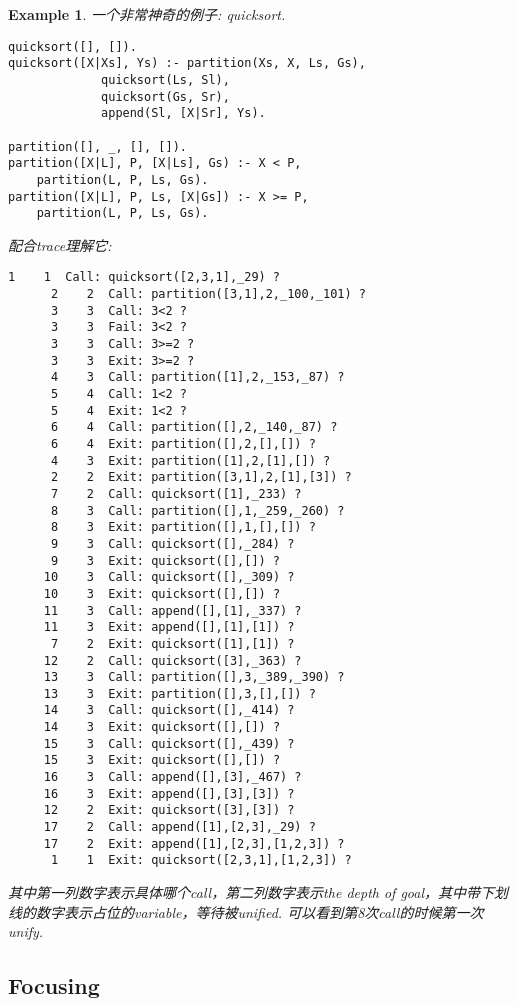 \documentclass{article}
\theoremstyle{plain}
\newtheorem{example}[theorem]{Example}
\theoremstyle{nonumberplain}
\begin{document}
\newpage
\begin{example}
\rm 一个非常神奇的例子: quicksort.
\begin{lstlisting}[basicstyle={\normalsize\ttfamily}]
quicksort([], []).
quicksort([X|Xs], Ys) :- partition(Xs, X, Ls, Gs),
			 quicksort(Ls, Sl),
			 quicksort(Gs, Sr),
			 append(Sl, [X|Sr], Ys).
						
partition([], _, [], []).
partition([X|L], P, [X|Ls], Gs) :- X < P,
	partition(L, P, Ls, Gs).
partition([X|L], P, Ls, [X|Gs]) :- X >= P,
	partition(L, P, Ls, Gs).
\end{lstlisting}
配合trace理解它:
\begin{lstlisting}[basicstyle={\small\ttfamily}]
      1    1  Call: quicksort([2,3,1],_29) ? 
      2    2  Call: partition([3,1],2,_100,_101) ? 
      3    3  Call: 3<2 ? 
      3    3  Fail: 3<2 ? 
      3    3  Call: 3>=2 ? 
      3    3  Exit: 3>=2 ? 
      4    3  Call: partition([1],2,_153,_87) ? 
      5    4  Call: 1<2 ? 
      5    4  Exit: 1<2 ? 
      6    4  Call: partition([],2,_140,_87) ? 
      6    4  Exit: partition([],2,[],[]) ? 
      4    3  Exit: partition([1],2,[1],[]) ? 
      2    2  Exit: partition([3,1],2,[1],[3]) ? 
      7    2  Call: quicksort([1],_233) ? 
      8    3  Call: partition([],1,_259,_260) ? 
      8    3  Exit: partition([],1,[],[]) ? 
      9    3  Call: quicksort([],_284) ? 
      9    3  Exit: quicksort([],[]) ? 
     10    3  Call: quicksort([],_309) ? 
     10    3  Exit: quicksort([],[]) ? 
     11    3  Call: append([],[1],_337) ? 
     11    3  Exit: append([],[1],[1]) ? 
      7    2  Exit: quicksort([1],[1]) ? 
     12    2  Call: quicksort([3],_363) ? 
     13    3  Call: partition([],3,_389,_390) ? 
     13    3  Exit: partition([],3,[],[]) ? 
     14    3  Call: quicksort([],_414) ? 
     14    3  Exit: quicksort([],[]) ? 
     15    3  Call: quicksort([],_439) ? 
     15    3  Exit: quicksort([],[]) ? 
     16    3  Call: append([],[3],_467) ? 
     16    3  Exit: append([],[3],[3]) ? 
     12    2  Exit: quicksort([3],[3]) ? 
     17    2  Call: append([1],[2,3],_29) ? 
     17    2  Exit: append([1],[2,3],[1,2,3]) ? 
      1    1  Exit: quicksort([2,3,1],[1,2,3]) ?
\end{lstlisting}
其中第一列数字表示具体哪个call，第二列数字表示the depth of goal，其中带下划线的数字表示占位的variable，等待被unified. 可以看到第8次call的时候第一次unify.
\end{example}

\newpage
\subsection{Focusing}
\end{document}
